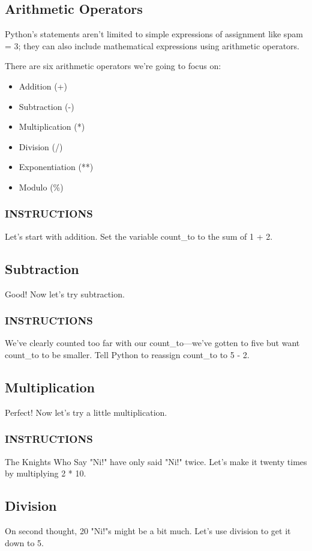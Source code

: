 \documentclass[12pt,a4paper,final,twoside,onecolumn,titlepage]{book}
\begin{document}
\subsection{Arithmetic Operators}
Python's statements aren't limited to simple expressions of assignment like spam = 3; they can also include mathematical expressions using arithmetic operators.

There are six arithmetic operators we're going to focus on:
\begin{itemize}
\item Addition (+)
\item Subtraction (-)
\item Multiplication (*)
\item Division (/)
\item Exponentiation (**)
\item Modulo (\%)
\end{itemize}

\subsubsection{INSTRUCTIONS}
Let's start with addition. Set the variable count\_to to the sum of 1 + 2.

\subsection{Subtraction}
Good! Now let's try subtraction.

\subsubsection{INSTRUCTIONS}
We've clearly counted too far with our count\_to—we've gotten to five but want count\_to to be smaller. Tell Python to reassign count\_to to 5 - 2.

\subsection{Multiplication}
Perfect! Now let's try a little multiplication.

\subsubsection{INSTRUCTIONS}
The Knights Who Say "Ni!" have only said "Ni!" twice. Let's make it twenty times by multiplying 2 * 10.

\subsection{Division}
On second thought, 20 "Ni!"s might be a bit much. Let's use division to get it down to 5.
\end{document}
